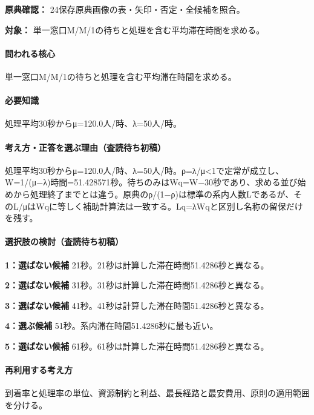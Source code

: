 \noindent\textbf{原典確認：} 24保存原典画像の表・矢印・否定・全候補を照合。\par

\noindent\textbf{対象：} 単一窓口M/M/1の待ちと処理を含む平均滞在時間を求める。\par

\paragraph{問われる核心} 単一窓口M/M/1の待ちと処理を含む平均滞在時間を求める。

\paragraph{必要知識} 処理平均30秒からμ=120.0人/時、λ=50人/時。

\paragraph{考え方・正答を選ぶ理由（査読待ち初稿）} 処理平均30秒からμ=120.0人/時、λ=50人/時。ρ=λ/μ<1で定常が成立し、W=\allowbreak{}1/(μ−λ)時間=51.428571秒。待ちのみはWq=\allowbreak{}W−30秒であり、求める並び始めから処理終了までとは違う。原典のρ/(1−ρ)は標準の系内人数Lであるが、そのL/μはWqに等しく補助計算法は一致する。Lq=λWqと区別し名称の留保だけを残す。

\paragraph{選択肢の検討（査読待ち初稿）}\mbox{}\par

\noindent\textbf{1：選ばない候補} 21秒。21秒は計算した滞在時間51.4286秒と異なる。\par

\noindent\textbf{2：選ばない候補} 31秒。31秒は計算した滞在時間51.4286秒と異なる。\par

\noindent\textbf{3：選ばない候補} 41秒。41秒は計算した滞在時間51.4286秒と異なる。\par

\noindent\textbf{4：選ぶ候補} 51秒。系内滞在時間51.4286秒に最も近い。\par

\noindent\textbf{5：選ばない候補} 61秒。61秒は計算した滞在時間51.4286秒と異なる。\par

\paragraph{再利用する考え方} 到着率と処理率の単位、資源制約と利益、最長経路と最安費用、原則の適用範囲を分ける。


